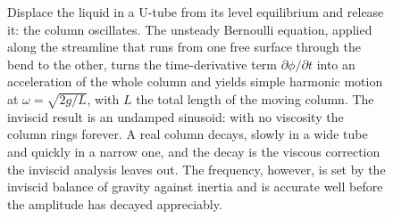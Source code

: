 \begin{figure}[htbp]
\centering
{}
\caption[Oscillating liquid column in a U-tube]{Displace the liquid in
a U-tube from its level equilibrium and release it: the column
oscillates. The unsteady Bernoulli equation, applied along the
streamline that runs from one free surface through the bend to the
other, turns the time-derivative term $\partial\phi/\partial t$ into
an acceleration of the whole column and yields simple harmonic motion
at $\omega=\sqrt{2g/L}$, with $L$ the total length of the moving
column. The inviscid result is an undamped sinusoid: with no viscosity
the column rings forever. A real column decays, slowly in a wide tube
and quickly in a narrow one, and the decay is the viscous correction
the inviscid analysis leaves out. The frequency, however, is set by
the inviscid balance of gravity against inertia and is accurate well
before the amplitude has decayed appreciably.}
\label{fig:vol03ch11:oscillating-column}
\end{figure}
